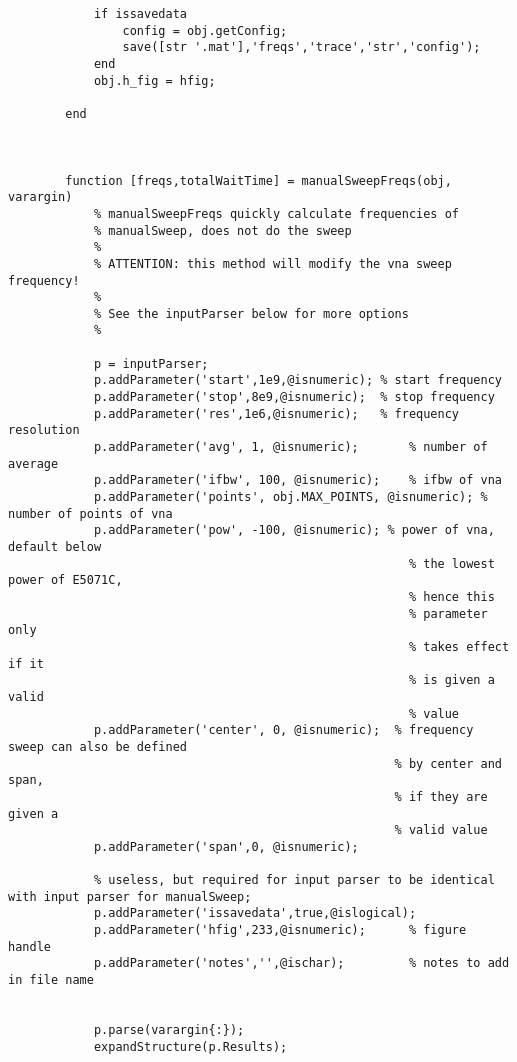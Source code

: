 \begin{lstlisting}
            if issavedata
                config = obj.getConfig;
                save([str '.mat'],'freqs','trace','str','config');
            end      
            obj.h_fig = hfig;
            
        end
        
        
        
        function [freqs,totalWaitTime] = manualSweepFreqs(obj, varargin)
            % manualSweepFreqs quickly calculate frequencies of
            % manualSweep, does not do the sweep
            %
            % ATTENTION: this method will modify the vna sweep frequency!
            %
            % See the inputParser below for more options
            %
            
            p = inputParser;
            p.addParameter('start',1e9,@isnumeric); % start frequency
            p.addParameter('stop',8e9,@isnumeric);  % stop frequency
            p.addParameter('res',1e6,@isnumeric);   % frequency resolution
            p.addParameter('avg', 1, @isnumeric);       % number of average
            p.addParameter('ifbw', 100, @isnumeric);    % ifbw of vna
            p.addParameter('points', obj.MAX_POINTS, @isnumeric); % number of points of vna
            p.addParameter('pow', -100, @isnumeric); % power of vna, default below
                                                        % the lowest power of E5071C,
                                                        % hence this
                                                        % parameter only
                                                        % takes effect if it
                                                        % is given a valid
                                                        % value
            p.addParameter('center', 0, @isnumeric);  % frequency sweep can also be defined
                                                      % by center and span,
                                                      % if they are given a
                                                      % valid value
            p.addParameter('span',0, @isnumeric);
            
            % useless, but required for input parser to be identical with input parser for manualSweep; 
            p.addParameter('issavedata',true,@islogical);
            p.addParameter('hfig',233,@isnumeric);      % figure handle
            p.addParameter('notes','',@ischar);         % notes to add in file name
            
            
            p.parse(varargin{:});
            expandStructure(p.Results);
            

\end{lstlisting}
